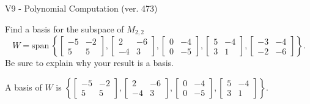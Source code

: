 \begin{exercise}
  \begin{exerciseTitle}V9 - Polynomial Computation (ver. 473)\end{exerciseTitle}
  \begin{exerciseStatement}
    Find a basis for the subspace of \(M_{2,2}\) 
\[W=\mathrm{span}\ \left\{\left[\begin{array}{cc}
-5 & -2 \\
5 & 5
\end{array}\right] , \left[\begin{array}{cc}
2 & -6 \\
-4 & 3
\end{array}\right] , \left[\begin{array}{cc}
0 & -4 \\
0 & -5
\end{array}\right] , \left[\begin{array}{cc}
5 & -4 \\
3 & 1
\end{array}\right] , \left[\begin{array}{cc}
-3 & -4 \\
-2 & -6
\end{array}\right]\right\}.\]
 Be sure to explain why your result is a basis.


  \end{exerciseStatement}
  \begin{exerciseAnswer}
   A basis of \(W\) is  \(\left\{\left[\begin{array}{cc}
-5 & -2 \\
5 & 5
\end{array}\right] , \left[\begin{array}{cc}
2 & -6 \\
-4 & 3
\end{array}\right] , \left[\begin{array}{cc}
0 & -4 \\
0 & -5
\end{array}\right] , \left[\begin{array}{cc}
5 & -4 \\
3 & 1
\end{array}\right]\right\}\).
  


  \end{exerciseAnswer}
\end{exercise}
